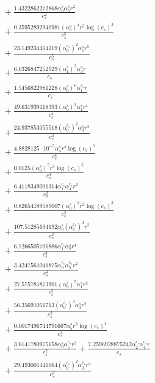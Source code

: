 \documentclass[10pt]{article}
\begin{document}
\begin{align*}
&{}  + \frac{1.4322862272868 \alpha_{0}^s \alpha_{5}^s r^{2}}{c_{s}^{2}} \\
&{}  + \frac{0.35952892940981 \left(\alpha_{0}^s\right)^{4} r^{5} \log{\left(c_{s} \right)}^{3}}{c_{s}^{5}} \\
&{}  + \frac{23.149234464219 \left(\alpha_{0}^{c_s}\right)^{2} \alpha_{1}^s r^{5}}{c_{s}^{5}} \\
&{}  + \frac{6.0326847252929 \left(\alpha_{1}^s\right)^{2} \alpha_{3}^s r}{c_{s}} \\
&{}  + \frac{1.5456822981228 \left(\alpha_{0}^s\right)^{6} \alpha_{1}^{c_s} r}{c_{s}} \\
&{}  + \frac{49.631939118393 \left(\alpha_{0}^s\right)^{3} \alpha_{1}^s r^{4}}{c_{s}^{4}} \\
&{}  + \frac{24.937853055518 \left(\alpha_{0}^{c_s}\right)^{2} \alpha_{3}^s r^{3}}{c_{s}^{3}} \\
&{}  + \frac{4.8828125 \cdot 10^{-5} \alpha_{4}^s r^{4} \log{\left(c_{s} \right)}^{5}}{c_{s}^{4}} \\
&{}  + \frac{0.0125 \left(\alpha_{0}^s\right)^{5} r^{4} \log{\left(c_{s} \right)}^{5}}{c_{s}^{4}} \\
&{}  + \frac{6.4118349001314 \alpha_{1}^{c_s} \alpha_{4}^{c_s} r^{2}}{c_{s}^{2}} \\
&{}  + \frac{0.82654189589007 \left(\alpha_{0}^s\right)^{7} r^{2} \log{\left(c_{s} \right)}^{3}}{c_{s}^{2}} \\
&{}  + \frac{107.51285694192 \alpha_{0}^s \left(\alpha_{1}^{c_s}\right)^{3} r^{2}}{c_{s}^{2}} \\
&{}  + \frac{6.7266505706886 \alpha_{1}^{c_s} \alpha_{2}^s r^{4}}{c_{s}^{4}} \\
&{}  + \frac{3.4247561041875 \alpha_{0}^{c_s} \alpha_{5}^{c_s} r^{2}}{c_{s}^{2}} \\
&{}  + \frac{27.575781873901 \left(\alpha_{0}^s\right)^{5} \alpha_{1}^s r^{2}}{c_{s}^{2}} \\
&{}  + \frac{56.35691051713 \left(\alpha_{0}^{c_s}\right)^{3} \alpha_{3}^s r^{2}}{c_{s}^{2}} \\
&{}  + \frac{0.0017496744791667 \alpha_{5}^s r^{3} \log{\left(c_{s} \right)}^{4}}{c_{s}^{3}} \\
&{}  + \frac{3.6141780975658 \alpha_{0}^s \alpha_{5}^{c_s} r^{2}}{c_{s}^{2}} + \frac{7.2596928875242 \alpha_{2}^{c_s} \alpha_{4}^{c_s} r}{c_{s}} \\
&{}  + \frac{29.493001441064 \left(\alpha_{0}^{c_s}\right)^{2} \alpha_{3}^{c_s} r^{3}}{c_{s}^{3}} \\

\end{align*}
\end{document}
